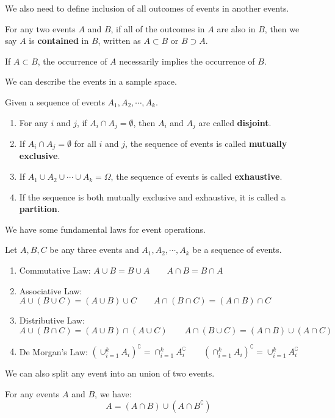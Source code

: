 \documentclass{huhtakm-template-book}
\begin{document}
\newpage
We also need to define inclusion of all outcomes of events in another events.
\begin{defn}
	For any two events $A$ and $B$, if all of the outcomes in $A$ are also in $B$, then we say $A$ is \textbf{contained} in $B$, written as $A\subset B$ or $B\supset A$.
\end{defn}
\begin{rem}
	If $A\subset B$, the occurrence of $A$ necessarily implies the occurrence of $B$.
\end{rem}
We can describe the events in a sample space.
\begin{defn}
	Given a sequence of events $A_{1},A_{2},\cdots,A_{k}$.
	\begin{enumerate}
		\item For any $i$ and $j$, if $A_{i}\cap A_{j}=\emptyset$, then $A_{i}$ and $A_{j}$ are called \textbf{disjoint}.
		\item If $A_{i}\cap A_{j}=\emptyset$ for all $i$ and $j$, the sequence of events is called \textbf{mutually exclusive}.
		\item If $A_{1}\cup A_{2}\cup\cdots\cup A_{k}=\Omega$, the sequence of events is called \textbf{exhaustive}.
		\item If the sequence is both mutually exclusive and exhaustive, it is called a \textbf{partition}.
	\end{enumerate}
\end{defn}
We have some fundamental laws for event operations.
\begin{thm}
	Let $A,B,C$ be any three events and $A_{1},A_{2},\cdots,A_{k}$ be a sequence of events.
	\begin{enumerate}
		\item Commutative Law: $A\cup B=B\cup A\qquad A\cap B=B\cap A$
		\item Associative Law: $A\cup(B\cup C)=(A\cup B)\cup C\qquad A\cap(B\cap C)=(A\cap B)\cap C$
		\item Distributive Law: $A\cup(B\cap C)=(A\cup B)\cap(A\cup C)\qquad A\cap(B\cup C)=(A\cap B)\cup(A\cap C)$
		\item De Morgan's Law: $(\cup_{i=1}^{k}A_{i})^{\complement}=\cap_{i=1}^{k}A_{i}^{\complement}\qquad (\cap_{i=1}^{k}A_{i})^{\complement}=\cup_{i=1}^{k}A_{i}^{\complement}$
	\end{enumerate}
\end{thm}
We can also split any event into an union of two events.
\begin{lem}
	For any events $A$ and $B$, we have:
	\begin{equation*}
		A=(A\cap B)\cup(A\cap B^{\complement})
	\end{equation*}
\end{lem}
\end{document}
